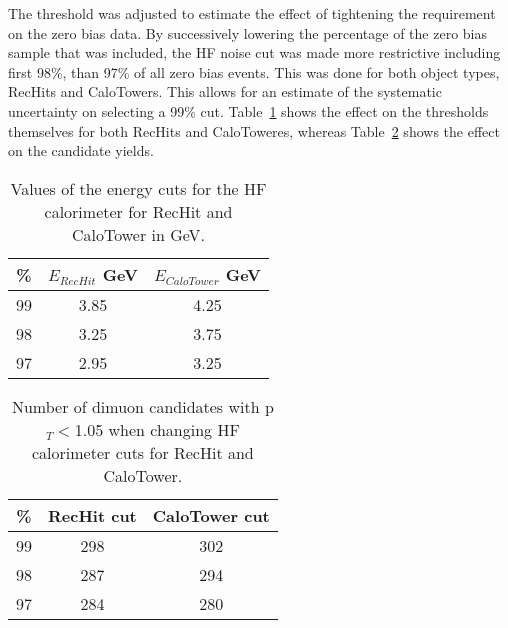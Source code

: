       The threshold was adjusted to estimate the effect of tightening the
        requirement on the zero bias data.
      By successively lowering the percentage of the zero bias sample
        that was included, the HF noise cut was made more restrictive including
        first 98\%, than 97\% of all zero bias events. 
      This was done for both object types, RecHits and CaloTowers.
      This allows for an estimate of the systematic uncertainty on selecting 
        a 99\% cut.
      Table~\ref{tab:hfAdjustedThresholds} shows the effect on the thresholds
        themselves for both RecHits and CaloToweres, whereas 
        Table~\ref{tab:hfAdjThreshYields} shows the effect on the candidate 
        yields.

      \begin{table}[!Hhbt]
        \begin{center}
          \caption{Values of the energy cuts for the HF calorimeter for RecHit and CaloTower in GeV.}
          \label{tab:hfAdjustedThresholds}
          \begin{tabular}{|c|c|c|} \hline
            \% &  $E_{RecHit}$ GeV & $E_{CaloTower}$ GeV\\ 
            \hline
            99 & 3.85& 4.25 \\ \hline
            98 & 3.25& 3.75 \\ \hline
            97 & 2.95& 3.25 \\  \hline
           \end{tabular}
         \end{center}
      \end{table}

      \begin{table}[!Hhbt]
        \begin{center}
          \caption{Number of dimuon candidates with  p$_{T} <$1.05 when changing HF calorimeter cuts for RecHit and CaloTower.}
          \label{tab:hfAdjThreshYields}
          \begin{tabular}{|c|c|c|} \hline
            \% &  RecHit cut & CaloTower cut\\ \hline
            99 &   298 & 302 \\ \hline
            98 &  287  & 294 \\ \hline
            97 & 284 & 280 \\ \hline
          \end{tabular}
        \end{center}
      \end{table}

